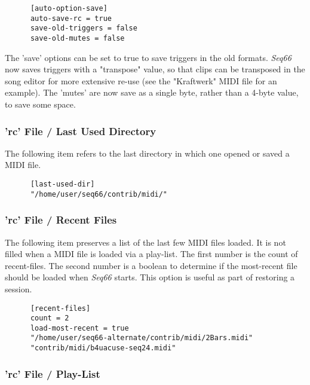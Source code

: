    \begin{verbatim}
      [auto-option-save]
      auto-save-rc = true
      save-old-triggers = false
      save-old-mutes = false
   \end{verbatim}

   The 'save' options can be set to true to save triggers in the old formats.
   \textsl{Seq66} now saves triggers with a "transpose" value, so that
   clips can be transposed in the song editor for more extensive re-use
   (see the "Kraftwerk" MIDI file for an example).
   The 'mutes' are now save as a single byte, rather than a 4-byte value, to
   save some space.

\subsubsection{'rc' File / Last Used Directory}
\label{subsubsec:configuration_rc_last_used_dir}

   The following item refers to the last directory in which one opened or
   saved a MIDI file.

   \begin{verbatim}
      [last-used-dir]
      "/home/user/seq66/contrib/midi/"
   \end{verbatim}

\subsubsection{'rc' File / Recent Files}
\label{subsubsec:configuration_rc_recent_files}

   The following item preserves a list of the last few MIDI files loaded.
   It is not filled when a MIDI file is loaded via a play-list.
   The first number is the count of recent-files.
   The second number is a boolean to determine if the most-recent file
   should be loaded when \textsl{Seq66} starts.
   This option is useful as part of restoring a session.

   \begin{verbatim}
      [recent-files]
      count = 2
      load-most-recent = true
      "/home/user/seq66-alternate/contrib/midi/2Bars.midi"
      "contrib/midi/b4uacuse-seq24.midi"
   \end{verbatim}

\subsubsection{'rc' File / Play-List}
\label{subsubsec:configuration_rc_playlist}

